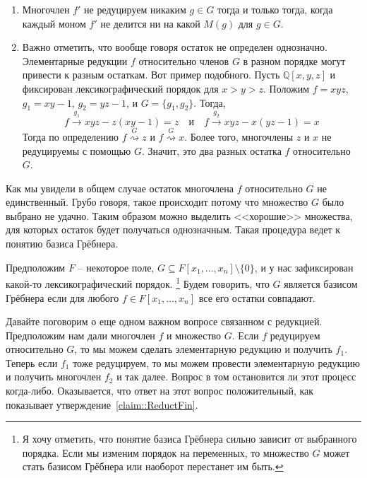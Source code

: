 \begin{remarks}
\begin{enumerate}
\item Многочлен $f'$ не редуцируем никаким $g\in G$ тогда и только тогда, когда каждый моном $f'$ не делится ни на какой $M(g)$ для $g\in G$.

\item Важно отметить, что вообще говоря остаток не определен однозначно.
Элементарные редукции $f$ относительно членов $G$ в разном порядке могут привести к разным остаткам.
Вот пример подобного.
Пусть $\mathbb Q[x, y, z]$ и фиксирован лексикографический порядок для $x > y > z$.
Положим $f = xyz$, $g_1 = xy - 1$, $g_2 = yz - 1$, и $G = \{g_1, g_2\}$.
Тогда,
\[
f\stackrel{g_1}{\longrightarrow}xyz - z(xy - 1) = z
\quad\text{и}\quad
f\stackrel{g_2}{\longrightarrow}xyz - x(yz - 1) = x
\]
Тогда по определению $f\stackrel{G}{\rightsquigarrow} z$ и $f\stackrel{G}{\rightsquigarrow} x$.
Более того, многочлены $z$ и $x$ не редуцируемы с помощью $G$.
Значит, это два разных остатка $f$ относительно $G$.
\end{enumerate}
\end{remarks}

Как мы увидели в общем случае остаток многочлена $f$ относительно $G$ не единственный.
Грубо говоря, такое происходит потому что множество $G$ было выбрано не удачно.
Таким образом можно выделить <<хорошие>> множества, для которых остаток будет получаться однозначным.
Такая процедура ведет к понятию базиса Грёбнера.

\begin{definition}
Предположим $F$ -- некоторое поле, $G\subseteq F[x_1,\ldots,x_n]\setminus\{0\}$, и у нас зафиксирован какой-то лексикографический порядок.%
\footnote{Я хочу отметить, что понятие базиса Грёбнера сильно зависит от выбранного порядка.
Если мы изменим порядок на переменных, то множество $G$ может стать базисом Грёбнера или наоборот перестанет им быть.}
Будем говорить, что $G$ является базисом Грёбнера если для любого $f\in F[x_1,\ldots,x_n]$ все его остатки совпадают.
\end{definition}

Давайте поговорим о еще одном важном вопросе связанном с редукцией.
Предположим нам дали многочлен $f$ и множество $G$.
Если $f$ редуцируем относительно $G$, то мы можем сделать элементарную редукцию и получить $f_1$.
Теперь если $f_1$ тоже редуцируем, то мы можем провести элементарную редукцию и получить многочлен $f_2$ и так далее.
Вопрос в том остановится ли этот процесс когда-либо.
Оказывается, что ответ на этот вопрос положительный, как показывает утверждение~\ref{claim::ReductFin}.

